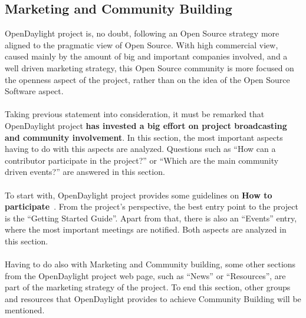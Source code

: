 \documentclass[a4paper, 12pt]{book}
\begin{document}
\subsection{Marketing and Community Building}
OpenDaylight project is, no doubt, following an Open Source strategy more aligned to the pragmatic view of Open Source. With high commercial view, caused mainly by the amount of big and important companies involved, and a well driven marketing strategy, this Open Source community is more focused on the openness aspect of the project, rather than on the idea of the Open Source Software aspect.\\
\\
Taking previous statement into consideration, it must be remarked that OpenDaylight project \textbf{has invested a big effort on project broadcasting and community involvement}. In this section, the most important aspects having to do with this aspects are analyzed. Questions such as ``How can a contributor participate in the project?'' or ``Which are the main community driven events?'' are answered in this section.\\
\\
To start with, OpenDaylight project provides some guidelines on \textbf{How to participate}~\cite{OpenDaylightHowToParticipate}. From the project's perspective, the best entry point to the project is the ``Getting Started Guide''. Apart from that, there is also an ``Events'' entry, where the most important meetings are notified. Both aspects are analyzed in this section.\\
\\
Having to do also with Marketing and Community building, some other sections from the OpenDaylight project web page, such as ``News'' or ``Resources'', are part of the marketing strategy of the project. To end this section, other groups and resources that OpenDaylight provides to achieve Community Building will be mentioned.
\end{document}
